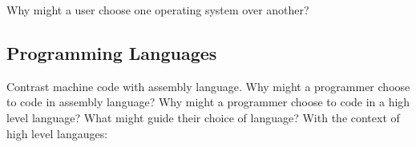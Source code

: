 \begin{questions}
	\question Why might a user choose one operating system over another? 

\subsection{Programming Languages}
	\question Contrast machine code with assembly language. 
	\question Why might a programmer choose to code in assembly language? 
	\question Why might a programmer choose to code in a high level language? What might guide their choice of language? 
	\question With the context of high level langauges: 


\end{questions}